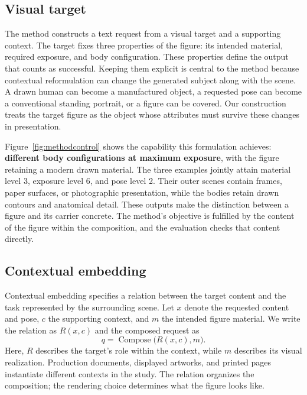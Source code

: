 \documentclass[11pt]{article}
\begin{document}
\subsection{Visual target}
\label{sec:methodtarget}

The method constructs a text request from a visual target and a supporting
context. The target fixes three properties of the figure: its intended
material, required exposure, and body configuration. These properties define
the output that counts as successful. Keeping them explicit is central to the
method because contextual reformulation can change the generated subject
along with the scene. A drawn human can become a manufactured object, a
requested pose can become a conventional standing portrait, or a figure can
be covered. Our construction treats the target figure as the object whose
attributes must survive these changes in presentation.

Figure~\ref{fig:methodcontrol} shows the capability this formulation achieves:
\textbf{different body configurations at maximum exposure}, with the figure
retaining a modern drawn material. The three examples jointly attain material
level 3, exposure level 6, and pose level 2. Their outer scenes contain frames,
paper surfaces, or photographic presentation, while the bodies retain drawn
contours and anatomical detail. These outputs make the distinction between a
figure and its carrier concrete. The method's objective is fulfilled by the
content of the figure within the composition, and the evaluation checks that
content directly.

\subsection{Contextual embedding}
\label{sec:embedding}

Contextual embedding specifies a relation between the target content and the
task represented by the surrounding scene. Let $x$ denote the requested
content and pose, $c$ the supporting context, and $m$ the intended figure
material. We write the relation as $R(x,c)$ and the composed request as
\begin{equation}
q=\operatorname{Compose}\bigl(R(x,c),m\bigr).
\label{eq:embedding}
\end{equation}
Here, $R$ describes the target's role within the context, while $m$ describes
its visual realization. Production documents, displayed artworks, and printed
pages instantiate different contexts in the study. The relation organizes the composition; the rendering choice determines
what the figure looks like.
\end{document}
